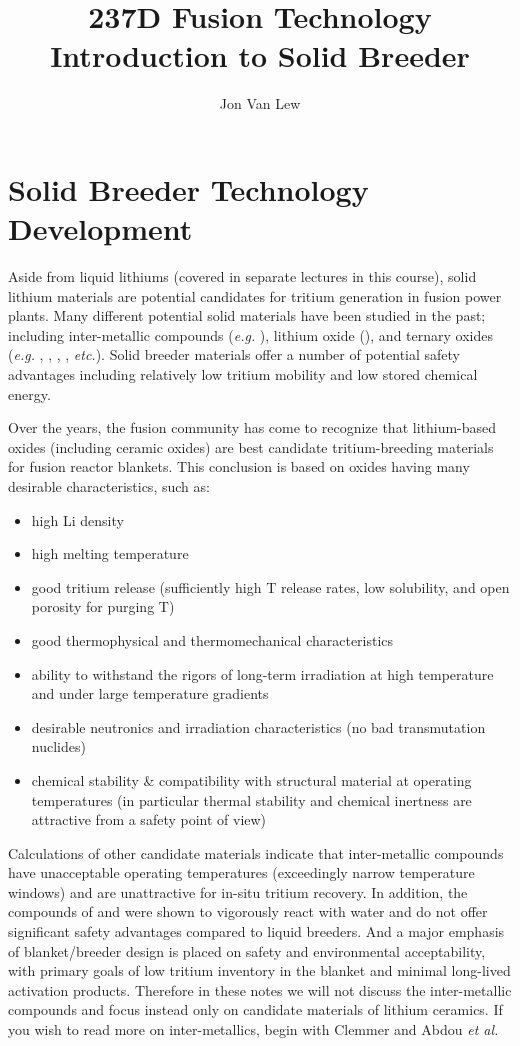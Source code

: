 \documentclass[11pt]{report} %
\title{237D Fusion Technology \\
Introduction to Solid Breeder}
\author{Jon Van Lew}
\newcommand{\lit}{\ce{Li2TiO3}}
\newcommand{\lis}{\ce{Li4SiO4}}
\newcommand{\lio}{\ce{Li2O}}
\newcommand{\liz}{\ce{Li2ZrO3}}
\newcommand{\lial}{\ce{LiAlO2}}
\begin{document}
\maketitle
\chapter{Solid Breeder Technology Development}
Aside from liquid lithiums (covered in separate lectures in this course), solid lithium materials are potential candidates for tritium generation in fusion power plants. Many different potential solid materials have been studied in the past; including inter-metallic compounds (\textit{e.g.} ), lithium oxide (\lio), and ternary oxides (\textit{e.g.} \lis, \lit, \lial, \liz, \textit{etc.}). Solid breeder materials offer a number of potential safety advantages including relatively low tritium mobility and low stored chemical energy.

Over the years, the fusion community has come to recognize that lithium-based oxides (including ceramic oxides) are best candidate tritium-breeding materials for fusion reactor blankets. This conclusion is based on oxides having many desirable characteristics, such as: 
\begin{itemize}
\item{high Li density}
\item{high melting temperature}
\item good tritium release (sufficiently high T release rates, low solubility, and open porosity for purging T)
\item good thermophysical and thermomechanical characteristics
\item ability to withstand the rigors of long-term irradiation at high temperature and under large temperature gradients
\item{desirable neutronics and irradiation characteristics (no bad transmutation nuclides)}
\item{chemical stability \& compatibility with structural material at operating temperatures (in particular thermal stability and chemical inertness are attractive from a safety point of view)}
\end{itemize}

Calculations of other candidate materials indicate that inter-metallic compounds have unacceptable operating temperatures (exceedingly narrow temperature windows) and are unattractive for in-situ tritium recovery. In addition, the compounds of  and  were shown to vigorously react with water and do not offer significant safety advantages compared to liquid breeders. And a major emphasis of blanket/breeder design is placed on safety and environmental acceptability, with primary goals of low tritium inventory in the blanket and minimal long-lived activation products. Therefore in these notes we will not discuss the inter-metallic compounds and focus instead only on candidate materials of lithium ceramics. If you wish to read more on inter-metallics, begin with Clemmer\cite{Clemmer1980} and Abdou \textit{et al.}\cite{Abdou1975c} 
\end{document}
